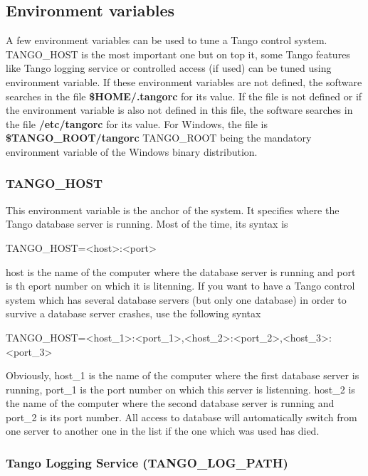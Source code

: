 \subsection{Environment variables}

A few environment variables can be used to tune a Tango control system.
TANGO\_HOST is the most important one but on top
it, some Tango features like Tango logging service or controlled access
(if used) can be tuned using environment variable. If these environment
variables are not defined, the software searches in the file \textbf{\$HOME/.tangorc}
for its value. If the file is not defined or if the environment variable
is also not defined in this file, the software searches in the file
\textbf{/etc/tangorc} for its value. For Windows,
the file is \textbf{\$TANGO\_ROOT/tangorc} TANGO\_ROOT
being the mandatory environment variable of the Windows binary distribution.

\subsubsection{TANGO\_HOST}

This environment variable is the anchor of the system. It specifies
where the Tango database server is running. Most of the time, its
syntax is\begin{center}TANGO\_HOST=<host>:<port>\end{center}host
is the name of the computer where the database server is running and
port is th eport number on which it is litenning. If you want to have
a Tango control system which has several database servers (but only
one database) in order to survive a database server crashes, use the
following syntax\begin{center}TANGO\_HOST=<host\_1>:<port\_1>,<host\_2>:<port\_2>,<host\_3>:<port\_3>\end{center}Obviously,
host\_1 is the name of the computer where the first database server
is running, port\_1 is the port number on which this server is listenning.
host\_2 is the name of the computer where the second database server
is running and port\_2 is its port number. All access to database
will automatically switch from one server to another one in the list
if the one which was used has died.

\subsubsection{Tango Logging Service (TANGO\_LOG\_PATH)}

